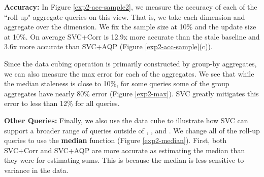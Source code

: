 \textbf{Accuracy: }
In Figure \ref{exp2-acc-sample2}, we measure the accuracy of each of the ``roll-up" aggregate queries on this view.
That is, we take each dimension and aggregate over the dimension.
We fix the sample size at 10\% and the update size at 10\%.
On average SVC+Corr is 12.9x more accurate than the stale baseline and 3.6x more accurate than SVC+AQP (Figure \ref{exp2-acc-sample}(c)). 

Since the data cubing operation is primarily constructed by group-by aggregates, we can also measure the max error for each of the aggregates.
We see that while the median staleness is close to 10\%, for some queries some of the group aggregates have nearly 80\% error (Figure \ref{exp2-max}).
SVC greatly mitigates this error to less than 12\% for all queries.

\textbf{Other Queries: }
Finally, we also use the data cube to illustrate how SVC can support a broader range of queries outside of \sumfunc, \countfunc, and \avgfunc.
We change all of the roll-up queries to use the \textbf{median} function (Figure \ref{exp2-median}).
First, both SVC+Corr and SVC+AQP are more accurate as estimating the median than they were for estimating sums. 
This is because the median is less sensitive to variance in the data.

